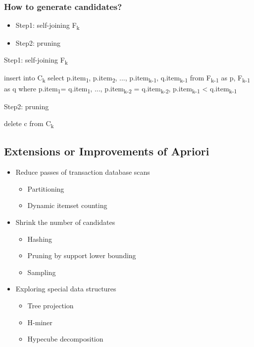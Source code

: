 \subsubsection{How to generate candidates?}

\begin{itemize}
\item Step1: self-joining F\textsubscript{k}
\item Step2: pruning
\end{itemize}


\begin{algorithm}
\caption{Step1: self-joining F\textsubscript{k}}
\begin{algorithmic}
\State insert into C\textsubscript{k}
\State select p.item\textsubscript{1}, p.item\textsubscript{2}, ..., p.item\textsubscript{k-1}, q.item\textsubscript{k-1}
\State from F\textsubscript{k-1} as p, F\textsubscript{k-1} as q
\State where p.item\textsubscript{1}= q.item\textsubscript{1}, ..., p.item\textsubscript{k-2} = q.item\textsubscript{k-2}, p.item\textsubscript{k-1} < q.item\textsubscript{k-1}
\end{algorithmic}
\end{algorithm}

\begin{algorithm}
\caption{Step2: pruning}
\begin{algorithmic}
            \State delete c from C\textsubscript{k}
        \EndIf
    \EndFor
\EndFor
\end{algorithmic}
\end{algorithm}    

\subsection{Extensions or Improvements of Apriori}
\begin{itemize}
\item Reduce passes of transaction database scans 
    \begin{itemize}
    \item Partitioning
    \item Dynamic itemset counting
    \end{itemize}
\item Shrink the number of candidates
    \begin{itemize}
    \item Hashing
    \item Pruning by support lower bounding
    \item Sampling
    \end{itemize}
\item Exploring special data structures
    \begin{itemize}
    \item Tree projection
    \item H-miner
    \item Hypecube decomposition
    \end{itemize}
\end{itemize}  


